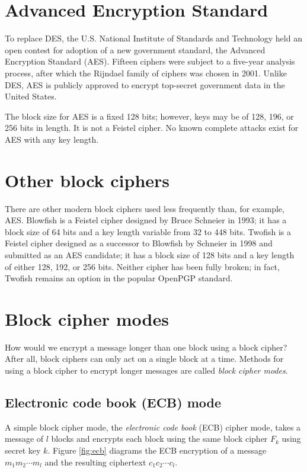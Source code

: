 \documentclass{book}
\theoremstyle{plain}
\theoremstyle{definition}
\begin{document}
\section{Advanced Encryption Standard}
To replace DES, the U.S. National Institute of Standards and Technology held an open contest for adoption of a new government standard, the Advanced Encryption Standard (AES). Fifteen ciphers were subject to a five-year analysis process, after which the Rijndael family of ciphers was chosen in 2001. Unlike DES, AES is publicly approved to encrypt top-secret government data in the United States.

The block size for AES is a fixed 128 bits; however, keys may be of 128, 196, or 256 bits in length. It is not a Feistel cipher. No known complete attacks exist for AES with any key length.

\section{Other block ciphers}
There are other modern block ciphers used less frequently than, for example, AES. Blowfish is a Feistel cipher designed by Bruce Schneier in 1993; it has a block size of 64 bits and a key length variable from 32 to 448 bits. Twofish is a Feistel cipher designed as a successor to Blowfish by Schneier in 1998 and submitted as an AES candidate; it has a block size of 128 bits and a key length of either 128, 192, or 256 bits. Neither cipher has been fully broken; in fact, Twofish remains an option in the popular OpenPGP standard.

\section{Block cipher modes}
How would we encrypt a message longer than one block using a block cipher? After all, block ciphers can only act on a single block at a time. Methods for using a block cipher to encrypt longer messages are called {\it block cipher modes}.

\subsection{Electronic code book (ECB) mode}
A simple block cipher mode, the {\it electronic code book} (ECB) cipher mode, takes a message of $l$ blocks and encrypts each block using the same block cipher $F_k$ using secret key $k$. Figure \ref{fig:ecb} diagrams the ECB encryption of a message $m_1m_2 \cdots m_l$ and the resulting ciphertext $c_1c_2 \cdots c_l$. 
\end{document}
